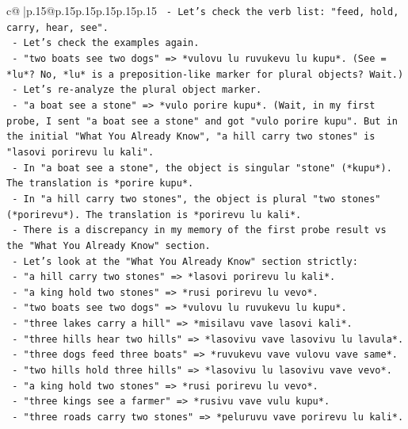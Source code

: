 \documentclass{article}
\begin{document}
{\begin{supertabular}{c@{$\;$}|p{.15\linewidth}@{}p{.15\linewidth}p{.15\linewidth}p{.15\linewidth}p{.15\linewidth}p{.15\linewidth}}
{{{\texttt{   {-} Let's check the verb list: "feed, hold, carry, hear, see".} \\
\texttt{   {-} Let's check the examples again.} \\
\texttt{     {-} "two boats see two dogs" => *vulovu lu ruvukevu lu kupu*. (See = *lu*? No, *lu* is a preposition{-}like marker for plural objects? Wait.)} \\
\texttt{     {-} Let's re{-}analyze the plural object marker.} \\
\texttt{       {-} "a boat see a stone" => *vulo porire kupu*. (Wait, in my first probe, I sent "a boat see a stone" and got "vulo porire kupu". But in the initial "What You Already Know", "a hill carry two stones" is "lasovi porirevu lu kali".} \\
\texttt{       {-} In "a boat see a stone", the object is singular "stone" (*kupu*). The translation is *porire kupu*.} \\
\texttt{       {-} In "a hill carry two stones", the object is plural "two stones" (*porirevu*). The translation is *porirevu lu kali*.} \\
\texttt{       {-} There is a discrepancy in my memory of the first probe result vs the "What You Already Know" section.} \\
\texttt{       {-} Let's look at the "What You Already Know" section strictly:} \\
\texttt{         {-} "a hill carry two stones" => *lasovi porirevu lu kali*.} \\
\texttt{         {-} "a king hold two stones" => *rusi porirevu lu vevo*.} \\
\texttt{         {-} "two boats see two dogs" => *vulovu lu ruvukevu lu kupu*.} \\
\texttt{         {-} "three lakes carry a hill" => *misilavu vave lasovi kali*.} \\
\texttt{         {-} "three hills hear two hills" => *lasovivu vave lasovivu lu lavula*.} \\
\texttt{         {-} "three dogs feed three boats" => *ruvukevu vave vulovu vave same*.} \\
\texttt{         {-} "two hills hold three hills" => *lasovivu lu lasovivu vave vevo*.} \\
\texttt{         {-} "a king hold two stones" => *rusi porirevu lu vevo*.} \\
\texttt{         {-} "three kings see a farmer" => *rusivu vave vulu kupu*.} \\
\texttt{         {-} "three roads carry two stones" => *peluruvu vave porirevu lu kali*.} \\
}}}
\end{supertabular}}
\end{document}
